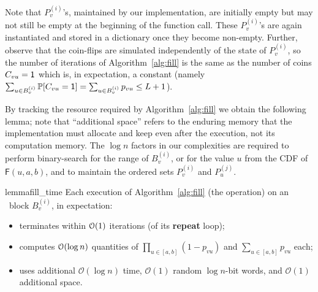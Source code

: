 Note that $P_v^{(i)}$'s, maintained by our implementation, are initially empty but may not still be empty at the beginning of the  function call. These $P_v^{(i)}$'s are again instantiated and stored in a dictionary once they become non-empty.
Further, observe that the coin-flips are simulated independently of the state of $P_v^{(i)}$, so the number of iterations of Algorithm~\ref{alg:fill} is the same as the number of coins $C_{vu} = \mathsf{1}$ which is, in expectation, a constant (namely $\sum_{u\in B^{(i)}_v} \mathbb P[C_{vu}=\mathsf{1}] = \sum_{u\in B^{(i)}_v} p_{vu} \leq L+1$). %



By tracking the resource required by Algorithm~\ref{alg:fill} we obtain the following lemma; note that ``additional space'' refers to the enduring memory that the implementation must allocate and keep even after the execution, not its computation memory. The $\log n$ factors in our complexities are required to perform binary-search for the range of $B^{(i)}_v$, or for the value $u$ from the CDF of $\mathsf{F}(u,a,b)$, and to maintain the ordered sets $P_v^{(i)}$ and $P_u^{(j)}$.

\begin{restatable}{lemma}{fill_time}
\label{lem:fill_time}
Each execution of Algorithm~\ref{alg:fill} (the  operation) on an \unfilled~block $B^{(i)}_v$, in expectation:
\begin{itemize}
\item terminates within $\mathcal{O}(1)$ iterations (of its \textup{\textbf{repeat}} loop);
\item computes $\mathcal{O}(\log n)$ quantities of $\prod_{u \in [a,b]} (1-p_{vu})$ and $\sum_{u\in[a,b]} p_{vu}$ each;
\item uses additional $\mathcal O(\log n)$ time, $\mathcal O(1)$ random $\log n$-bit words, and $\mathcal O(1)$ additional space.
\end{itemize}
\end{restatable}

